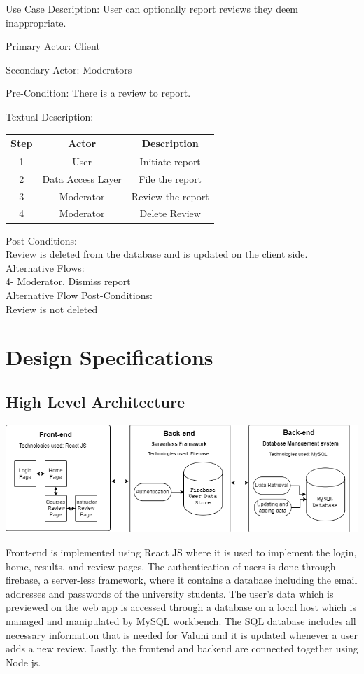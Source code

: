 \documentclass{article}
\begin{document}
Use Case Description: User can optionally report reviews they deem inappropriate.

	Primary Actor: Client

	Secondary Actor: Moderators

	Pre-Condition: There is a review to report.

	Textual Description:

\begin{center}
\begin{tabular}{|c|c|c|}
  \hline
  Step &
  Actor&
Description \\ \hline
  1&
  User&
Initiate report\\
  2&
  Data Access Layer&
File the report \\
  3&
  Moderator&
Review the report\\
  4&
  Moderator&
Delete Review\\ \hline

\end{tabular}
\end{center}

Post-Conditions: \\
	Review is deleted from the database and is updated on the client side.\\
Alternative Flows:\\
	4- Moderator, Dismiss report\\
	Alternative Flow Post-Conditions:\\
	Review is not deleted\\


\break
\section{Design Specifications}
\subsection{High Level Architecture}  
\begin{center}
\includegraphics[scale=0.65]{../../Milestone_2/Diagrams/High_Level_Arch.png}
\end{center}
\quad Front-end is implemented using React JS where it is used to implement the login, home, results, and review pages. The authentication of users is done through firebase, a server-less framework, where it contains a database including the email addresses and passwords of the university students. The user's data which is previewed on the web app is accessed through a database on a local host which is managed and manipulated by MySQL workbench. The SQL database includes all necessary information that is needed for Valuni and it is updated whenever a user adds a new review. Lastly, the frontend and backend are connected together using Node js. 
 
\end{document}
